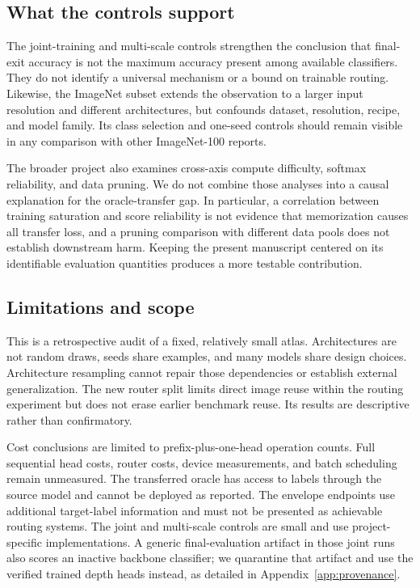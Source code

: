 \documentclass[11pt,a4paper]{article}
\begin{document}
\subsection{What the controls support}
The joint-training and multi-scale controls strengthen the conclusion that final-exit accuracy is not the maximum accuracy present among available classifiers. They do not identify a universal mechanism or a bound on trainable routing. Likewise, the ImageNet subset extends the observation to a larger input resolution and different architectures, but confounds dataset, resolution, recipe, and model family. Its class selection and one-seed controls should remain visible in any comparison with other ImageNet-100 reports.

The broader project also examines cross-axis compute difficulty, softmax reliability, and data pruning. We do not combine those analyses into a causal explanation for the oracle-transfer gap. In particular, a correlation between training saturation and score reliability is not evidence that memorization causes all transfer loss, and a pruning comparison with different data pools does not establish downstream harm. Keeping the present manuscript centered on its identifiable evaluation quantities produces a more testable contribution.

\subsection{Limitations and scope}
This is a retrospective audit of a fixed, relatively small atlas. Architectures are not random draws, seeds share examples, and many models share design choices. Architecture resampling cannot repair those dependencies or establish external generalization. The new router split limits direct image reuse within the routing experiment but does not erase earlier benchmark reuse. Its results are descriptive rather than confirmatory.

Cost conclusions are limited to prefix-plus-one-head operation counts. Full sequential head costs, router costs, device measurements, and batch scheduling remain unmeasured. The transferred oracle has access to labels through the source model and cannot be deployed as reported. The envelope endpoints use additional target-label information and must not be presented as achievable routing systems. The joint and multi-scale controls are small and use project-specific implementations. A generic final-evaluation artifact in those joint runs also scores an inactive backbone classifier; we quarantine that artifact and use the verified trained depth heads instead, as detailed in Appendix~\ref{app:provenance}.
\end{document}
